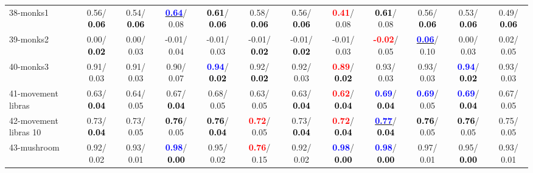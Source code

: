 \begin{table}[h]
\begin{center}
{\begin{tabular}{lc|c|c|c|c|c|c|c|c|c|c}
38-monks1 &   0.56/\textcolor{black}{\textbf{  0.06}} &   0.54/\textcolor{black}{\textbf{  0.06}} & \underline{\textcolor{blue}{\textbf{  0.64}}}/  0.08 & \textcolor{black}{\textbf{  0.61}}/\textcolor{black}{\textbf{  0.06}} &   0.58/\textcolor{black}{\textbf{  0.06}} &   0.56/\textcolor{black}{\textbf{  0.06}} & \textcolor{red}{\textbf{  0.41}}/  0.08 & \textcolor{black}{\textbf{  0.61}}/  0.08 &   0.56/\textcolor{black}{\textbf{  0.06}} &   0.53/\textcolor{black}{\textbf{  0.06}} &   0.49/\textcolor{black}{\textbf{  0.06}} \\
39-monks2 &   0.00/\textcolor{black}{\textbf{  0.02}} &   0.00/  0.03 &  -0.01/  0.04 &  -0.01/  0.03 &  -0.01/\textcolor{black}{\textbf{  0.02}} &  -0.01/\textcolor{black}{\textbf{  0.02}} &  -0.01/  0.03 & \textcolor{red}{\textbf{ -0.02}}/  0.05 & \underline{\textcolor{blue}{\textbf{  0.06}}}/  0.10 &   0.00/  0.03 &   0.02/  0.05 \\ \hline
40-monks3 &   0.91/  0.03 &   0.91/  0.03 &   0.90/  0.07 & \textcolor{blue}{\textbf{  0.94}}/\textcolor{black}{\textbf{  0.02}} &   0.92/\textcolor{black}{\textbf{  0.02}} &   0.92/  0.03 & \textcolor{red}{\textbf{  0.89}}/\textcolor{black}{\textbf{  0.02}} &   0.93/  0.03 &   0.93/  0.03 & \textcolor{blue}{\textbf{  0.94}}/\textcolor{black}{\textbf{  0.02}} &   0.93/  0.03 \\
41-movement libras &   0.63/\textcolor{black}{\textbf{  0.04}} &   0.64/  0.05 &   0.67/\textcolor{black}{\textbf{  0.04}} &   0.68/  0.05 &   0.63/  0.05 &   0.63/\textcolor{black}{\textbf{  0.04}} & \textcolor{red}{\textbf{  0.62}}/\textcolor{black}{\textbf{  0.04}} & \textcolor{blue}{\textbf{  0.69}}/\textcolor{black}{\textbf{  0.04}} & \textcolor{blue}{\textbf{  0.69}}/  0.05 & \textcolor{blue}{\textbf{  0.69}}/\textcolor{black}{\textbf{  0.04}} &   0.67/  0.05 \\
42-movement libras 10 &   0.73/\textcolor{black}{\textbf{  0.04}} &   0.73/  0.05 & \textcolor{black}{\textbf{  0.76}}/  0.05 & \textcolor{black}{\textbf{  0.76}}/\textcolor{black}{\textbf{  0.04}} & \textcolor{red}{\textbf{  0.72}}/  0.05 &   0.73/\textcolor{black}{\textbf{  0.04}} & \textcolor{red}{\textbf{  0.72}}/\textcolor{black}{\textbf{  0.04}} & \underline{\textcolor{blue}{\textbf{  0.77}}}/\textcolor{black}{\textbf{  0.04}} & \textcolor{black}{\textbf{  0.76}}/  0.05 & \textcolor{black}{\textbf{  0.76}}/  0.05 &   0.75/  0.05 \\
43-mushroom &   0.92/  0.02 &   0.93/  0.01 & \textcolor{blue}{\textbf{  0.98}}/\textcolor{black}{\textbf{  0.00}} &   0.95/  0.02 & \textcolor{red}{\textbf{  0.76}}/  0.15 &   0.92/  0.02 & \textcolor{blue}{\textbf{  0.98}}/\textcolor{black}{\textbf{  0.00}} & \textcolor{blue}{\textbf{  0.98}}/\textcolor{black}{\textbf{  0.00}} &   0.97/  0.01 &   0.95/\textcolor{black}{\textbf{  0.00}} &   0.93/  0.01 \\

\end{tabular}}
\end{center}
\end{table}
